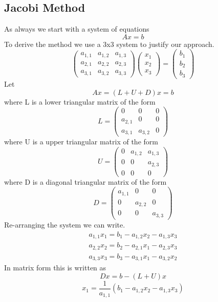 \subsection{Jacobi Method}
As always we start with a system of equations
\[Ax=b\]
To derive the  method we use a 3x3 system to justify our approach.
\[
\left( \begin{array}{ccc}
    a_{1,1} & a_{1,2} &a_{1,3} \\
    a_{2,1} & a_{2,2} &a_{2,3} \\
    a_{3,1} & a_{3,2} &a_{3,3}  \end{array} \right)
\left( \begin{array}{c}
    x_{1}  \\
    x_{2}  \\
    x_{3}  \end{array} \right)
=
\left( \begin{array}{c}
    b_{1}  \\
    b_{2}  \\
    b_{3}  \end{array} \right)
\]
Let
\[ Ax=(L+U+D)x=b \]
where L is a lower triangular matrix of the form
\[
L=\left( \begin{array}{ccc}
    0 & 0 & 0 \\
    a_{2,1} & 0 & 0 \\
    a_{3,1} & a_{3,2} & 0  \end{array} \right) \]
where U is a upper triangular matrix of the form
\[U=
\left( \begin{array}{ccc}
    0 & a_{1,2} &a_{1,3} \\
    0 & 0 &a_{2,3} \\
    0 & 0 & 0  \end{array} \right)\]
where D is a diagonal triangular matrix of the form
\[D=
\left( \begin{array}{ccc}
    a_{1,1} & 0 &0 \\
    0 & a_{2,2} &0 \\
    0 & 0 &a_{3,3}  \end{array} \right)\]
Re-arranging the system we can write.
\begin{eqnarray}
a_{1,1} x_1 = b_1 - a_{1,2}x_2 -a_{1,3}x_3 \\
a_{2,2} x_2 = b_2 - a_{2,1}x_1 -a_{2,3}x_3 \\
a_{3,3} x_3 = b_3 - a_{3,1}x_1 -a_{3,2}x_2 
\end{eqnarray}
In matrix form this is written as 
\[Dx = b-(L+U)x \]
\[x_1 = \frac{1}{a_{1,1}}(b_1 - a_{1,2}x_2 -a_{1,3}x_3) \]
